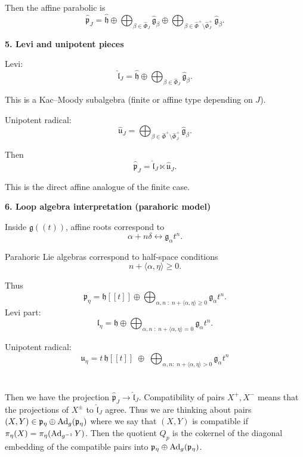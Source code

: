 \documentclass[12pt]{article}
\begin{document}
Then the affine parabolic is
\[
\widehat{\mathfrak{p}}_J
=
\widehat{\mathfrak{h}}
\oplus
\bigoplus_{\beta\in\widehat{\Phi}_J}
\widehat{\mathfrak{g}}_\beta
\oplus
\bigoplus_{\beta\in\widehat{\Phi}^+\setminus \widehat{\Phi}_J^+}
\widehat{\mathfrak{g}}_\beta.
\]

\medskip

\noindent\textbf{5. Levi and unipotent pieces}

Levi:
\[
\widehat{\mathfrak{l}}_J
=
\widehat{\mathfrak{h}}
\oplus
\bigoplus_{\beta\in\widehat{\Phi}_J}
\widehat{\mathfrak{g}}_\beta.
\]

This is a Kac--Moody subalgebra (finite or affine type depending on $J$).

Unipotent radical:
\[
\widehat{\mathfrak{u}}_J
=
\bigoplus_{\beta\in\widehat{\Phi}^+\setminus \widehat{\Phi}_J^+}
\widehat{\mathfrak{g}}_\beta.
\]

Then
\[
\boxed{
\widehat{\mathfrak{p}}_J
=
\widehat{\mathfrak{l}}_J
\ltimes
\widehat{\mathfrak{u}}_J.
}
\]

This is the direct affine analogue of the finite case.

\medskip

\noindent\textbf{6. Loop algebra interpretation (parahoric model)}

Inside $\mathfrak{g}((t))$, affine roots correspond to
\[
\alpha + n\delta
\leftrightarrow
\mathfrak{g}_\alpha t^n.
\]

Parahoric Lie algebras correspond to half-space conditions
\[
n + \langle \alpha,\eta\rangle \ge 0.
\]

Thus
\[
\mathfrak{p}_\eta
=
\mathfrak{h}[[t]]
\oplus
\bigoplus_{\alpha,n\;:\;n+\langle\alpha,\eta\rangle\ge 0}
\mathfrak{g}_\alpha t^n.
\]
Levi part:
\[
\mathfrak{l}_\eta
=
\mathfrak{h}
\oplus
\bigoplus_{\alpha,n\;:\;n+\langle\alpha,\eta\rangle=0}
\mathfrak{g}_\alpha t^n.
\]

Unipotent radical:
\[
\mathfrak u_\eta
=
t\,\mathfrak h[[t]]
\;\oplus\;
\bigoplus_{\alpha,n:\; n+\langle\alpha,\eta\rangle>0}
\mathfrak g_\alpha t^n
\]

\section{}
Then we have the projection $\widehat{\mathfrak{p}}_J \to \widehat{\mathfrak{l}}_J$. Compatibility of pairs $X^+,X^-$ means that the projections of $X^\pm$ to $\widehat{\mathfrak{l}}_J$ agree. Thus we are thinking about pairs $(X,Y)\in \mathfrak p_\eta \oplus \operatorname{Ad}_g(\mathfrak p_\eta)$ 
where we say that $(X,Y)$ is compatible if $\pi_\eta(X)=\pi_\eta(\operatorname{Ad}_{g^{-1}}Y)$. Then the quotient $Q_p$ is the cokernel of the diagonal embedding of the compatible pairs into $\mathfrak p_\eta \oplus \operatorname{Ad}_g(\mathfrak p_\eta)$.
\end{document}
